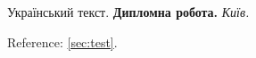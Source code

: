 \documentclass{article}
\begin{document}
Український текст. \textbf{Дипломна робота.} \textit{Київ.}

Reference: \ref{sec:test}.
\end{document}
